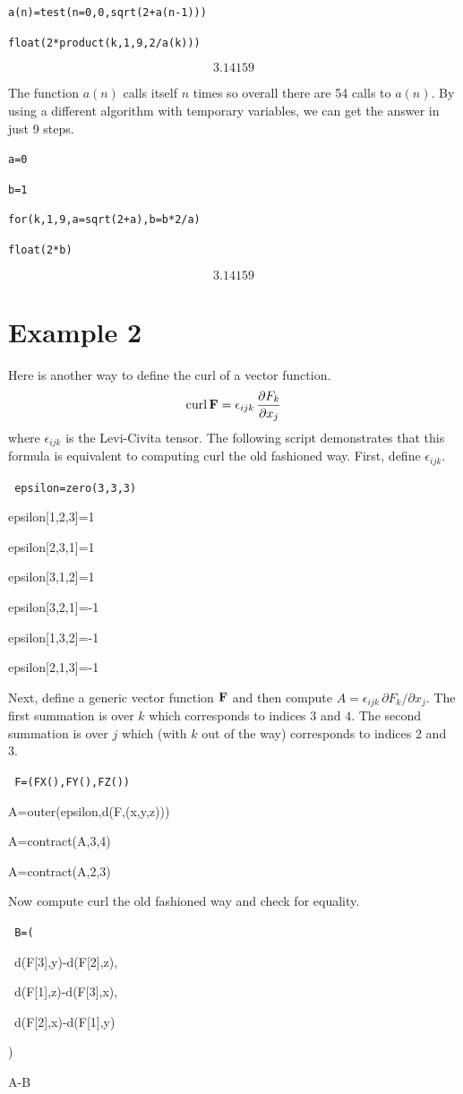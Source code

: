 \documentclass[12pt,openany]{report}
\begin{document}
\medskip
{\tt a(n)=test(n=0,0,sqrt(2+a(n-1)))}

{\tt float(2*product(k,1,9,2/a(k)))}

$$3.14159$$

\medskip
\noindent
The function $a(n)$ calls itself $n$ times so overall there are
54 calls to $a(n)$.
By using a different algorithm with temporary variables, we can get the answer in just 9 steps.

\medskip
{\tt a=0}

{\tt b=1}

{\tt for(k,1,9,a=sqrt(2+a),b=b*2/a)}

{\tt float(2*b)}

$$3.14159$$

\newpage

\label{example2}

\section*{Example 2}
Here is another way to define the curl of a vector function.
$$\mathop{\rm curl}{\bf F}=\epsilon_{ijk}\,{\partial F_k\over\partial x_j}$$
where $\epsilon_{ijk}$ is the Levi-Civita tensor.
The following script demonstrates that this formula is equivalent
to computing curl the old fashioned way.
First, define $\epsilon_{ijk}$.

\medskip
{\tt
epsilon=zero(3,3,3)

epsilon[1,2,3]=1

epsilon[2,3,1]=1

epsilon[3,1,2]=1

epsilon[3,2,1]=-1

epsilon[1,3,2]=-1

epsilon[2,1,3]=-1
}

\medskip
\noindent
Next, define a generic vector function $\bf F$ and
then compute $A=\epsilon_{ijk}\,\partial F_k/\partial x_j$.
The first summation is over $k$ which corresponds to indices 3 and 4.
The second summation is over $j$ which (with $k$ out of the way)
corresponds to indices 2 and 3.

\medskip
{\tt
F=(FX(),FY(),FZ())

A=outer(epsilon,d(F,(x,y,z)))

A=contract(A,3,4)

A=contract(A,2,3)
}

\medskip
\noindent
Now compute curl the old fashioned way and check for equality.

\medskip
{\tt
B=(

\ d(F[3],y)-d(F[2],z),

\ d(F[1],z)-d(F[3],x),

\ d(F[2],x)-d(F[1],y)

)

\medskip
A-B
}
\end{document}
